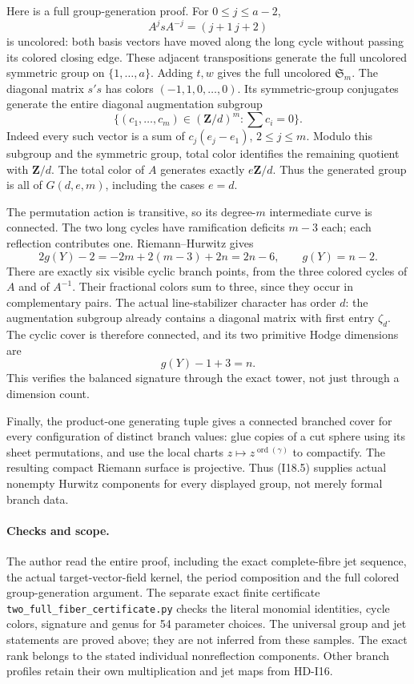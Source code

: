 Here is a full group-generation proof. For $0\leq j\leq a-2$,
\[
             A^jsA^{-j}=(j+1\,j+2)
\]
is uncolored: both basis vectors have moved along the long cycle
without passing its colored closing edge. These adjacent
transpositions generate the full uncolored symmetric group on
$\{1,\ldots,a\}$. Adding $t,w$ gives the full uncolored
$\mathfrak S_m$. The diagonal matrix $s's$ has colors
$(-1,1,0,\ldots,0)$. Its symmetric-group conjugates generate
the entire diagonal augmentation subgroup
\[
 \{(c_1,\ldots,c_m)\in(\mathbf Z/d)^m:
                                      \textstyle\sum c_i=0\}.
\]
Indeed every such vector is a sum of $c_j(e_j-e_1)$,
$2\leq j\leq m$. Modulo this subgroup and the symmetric
group, total color identifies the remaining quotient with
$\mathbf Z/d$. The total color of $A$ generates exactly
$e\mathbf Z/d$. Thus the generated group is all of
$G(d,e,m)$, including the cases $e=d$.

The permutation action is transitive, so its degree-$m$
intermediate curve is connected. The two long cycles have
ramification deficits $m-3$ each; each reflection contributes
one. Riemann--Hurwitz gives
\[
 2g(Y)-2=-2m+2(m-3)+2n=2n-6,
 \qquad g(Y)=n-2.
\]
There are exactly six visible cyclic branch points, from the
three colored cycles of $A$ and of $A^{-1}$. Their fractional
colors sum to three, since they occur in complementary pairs.
The actual line-stabilizer character has order $d$: the
augmentation subgroup already contains a diagonal matrix with
first entry $\zeta_d$. The cyclic cover is therefore connected,
and its two primitive Hodge dimensions are
\[
                    g(Y)-1+3=n.
\]
This verifies the balanced signature through the exact tower,
not just through a dimension count.

Finally, the product-one generating tuple gives a connected
branched cover for every configuration of distinct branch
values: glue copies of a cut sphere using its sheet permutations,
and use the local charts $z\mapsto z^{\operatorname{ord}(\gamma)}$
to compactify. The resulting compact Riemann surface is projective.
Thus (I18.5) supplies actual nonempty Hurwitz components for
every displayed group, not merely formal branch data.

\paragraph{Checks and scope.}
The author read the entire proof, including the exact complete-fibre
jet sequence, the actual target-vector-field kernel, the period
composition and the full colored group-generation argument.
The separate exact finite certificate
\texttt{two\_full\_fiber\_certificate.py} checks the literal
monomial identities, cycle colors, signature and genus for
54 parameter choices. The universal group and jet statements
are proved above; they are not inferred from these samples.
The exact rank belongs to the stated individual nonreflection
components. Other branch profiles retain their own multiplication
and jet maps from HD-I16.
